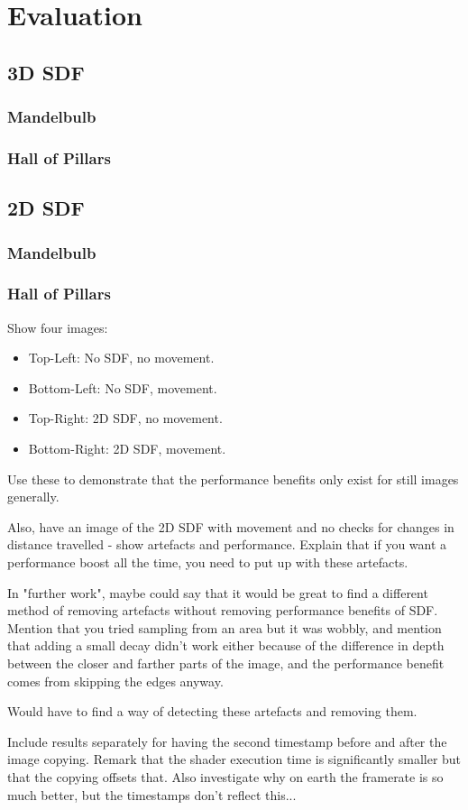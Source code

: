 \chapter{Evaluation}
\label{chapter:evaluation}

\section{3D SDF}

\subsection{Mandelbulb}

\subsection{Hall of Pillars}

\section{2D SDF}

\subsection{Mandelbulb}

\subsection{Hall of Pillars}

Show four images:
\begin{itemize}
	\item Top-Left: No SDF, no movement.
	\item Bottom-Left: No SDF, movement.
	\item Top-Right: 2D SDF, no movement.
	\item Bottom-Right: 2D SDF, movement.
\end{itemize}

Use these to demonstrate that the performance benefits only exist for still images generally.

Also, have an image of the 2D SDF with movement and no checks for changes in distance travelled - show artefacts and performance. Explain that if you want a performance boost all the time, you need to put up with these artefacts.

In "further work", maybe could say that it would be great to find a different method of removing artefacts without removing performance benefits of SDF. Mention that you tried sampling from an area but it was wobbly, and mention that adding a small decay didn't work either because of the difference in depth between the closer and farther parts of the image, and the performance benefit comes from skipping the edges anyway.

Would have to find a way of detecting these artefacts and removing them.

Include results separately for having the second timestamp before and after the image copying. Remark that the shader execution time is significantly smaller but that the copying offsets that. Also investigate why on earth the framerate is so much better, but the timestamps don't reflect this...